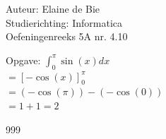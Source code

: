 \documentclass[a4paper]{article}
\begin{document}
  
\noindent \large Auteur: Elaine de Bie\\
\noindent \large Studierichting: Informatica\\
\noindent \large Oefeningenreeks 5A nr. 4.10\\


\medskip


\normalsize



Opgave:
$ \displaystyle \int_{0}^{\pi} \sin(x) dx $\\

$ = \left[-\cos(x)\right]_{0}^{\pi} $\\

$ = \left(-\cos(\pi) \right) - \left(- \cos(0) \right) $\\

$ = 1 + 1 = 2$\\





\begin{thebibliography}{999}
\end{thebibliography}
\end{document}
